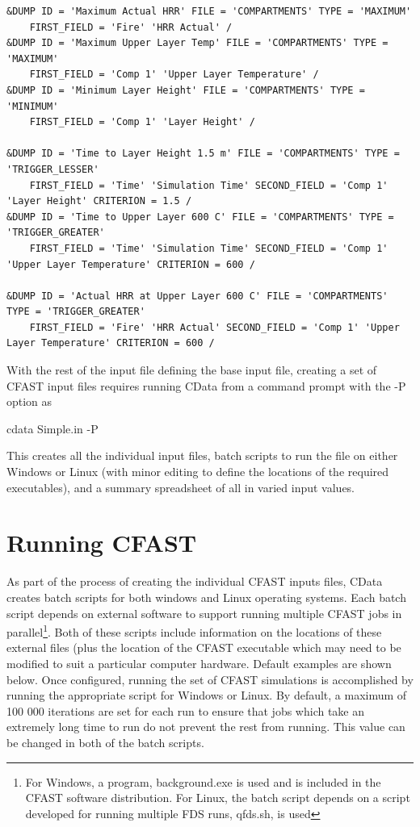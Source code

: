 \documentclass[12pt,twoside]{book}
\begin{document}
\begin{lstlisting}[basicstyle=\scriptsize]
&DUMP ID = 'Maximum Actual HRR' FILE = 'COMPARTMENTS' TYPE = 'MAXIMUM'
    FIRST_FIELD = 'Fire' 'HRR Actual' /
&DUMP ID = 'Maximum Upper Layer Temp' FILE = 'COMPARTMENTS' TYPE = 'MAXIMUM'
    FIRST_FIELD = 'Comp 1' 'Upper Layer Temperature' /
&DUMP ID = 'Minimum Layer Height' FILE = 'COMPARTMENTS' TYPE = 'MINIMUM'
    FIRST_FIELD = 'Comp 1' 'Layer Height' /

&DUMP ID = 'Time to Layer Height 1.5 m' FILE = 'COMPARTMENTS' TYPE = 'TRIGGER_LESSER'
    FIRST_FIELD = 'Time' 'Simulation Time' SECOND_FIELD = 'Comp 1' 'Layer Height' CRITERION = 1.5 /
&DUMP ID = 'Time to Upper Layer 600 C' FILE = 'COMPARTMENTS' TYPE = 'TRIGGER_GREATER'
    FIRST_FIELD = 'Time' 'Simulation Time' SECOND_FIELD = 'Comp 1' 'Upper Layer Temperature' CRITERION = 600 /

&DUMP ID = 'Actual HRR at Upper Layer 600 C' FILE = 'COMPARTMENTS' TYPE = 'TRIGGER_GREATER'
    FIRST_FIELD = 'Fire' 'HRR Actual' SECOND_FIELD = 'Comp 1' 'Upper Layer Temperature' CRITERION = 600 /
\end{lstlisting}

With the rest of the input file defining the base input file, creating a set of CFAST input files requires running CData from a command prompt with the {\ct -P} option as

{\ct cdata Simple.in -P}

This creates all the individual input files, batch scripts to run the file on either Windows or Linux (with minor editing to define the locations of the required executables), and a summary spreadsheet of all in varied input values.

\section{Running CFAST}


As part of the process of creating the individual CFAST inputs files, CData creates batch scripts for both windows and Linux operating systems. Each batch script depends on external software to support running multiple CFAST jobs in parallel\footnote{For Windows, a program, {\ct background.exe} is used and is included in the CFAST software distribution. For Linux, the batch script depends on a script developed for running multiple FDS runs, {\ct qfds.sh}, is used}. Both of these scripts include information on the locations of these external files (plus the location of the CFAST executable which may need to be modified to suit a particular computer hardware. Default examples are shown below. Once configured, running the set of CFAST simulations is accomplished by running the appropriate script for Windows or Linux. By default, a maximum of 100 000 iterations are set for each run to ensure that jobs which take an extremely long time to run do not prevent the rest from running.  This value can be changed in both of the batch scripts.
\end{document}

